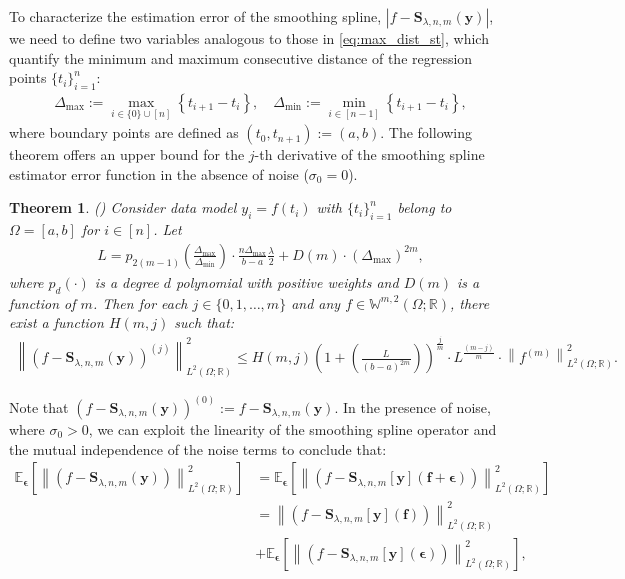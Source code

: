 \documentclass{article}
\newtheorem{theorem}{Theorem}
\newcommand{\norm}[1]{\left\lVert#1\right\rVert}
\newcommand{\lp}[1]{{L}^{#1}\left(\Omega; \mathbb{R}\right)}
\newcommand{\sob}[2]{\mathbb{W}^{#1,#2}\left(\Omega; \mathbb{R}\right)}
\newcommand{\spline}{\mathbf{S}_{\lambda,n,m}}
\begin{document}
To characterize the estimation error of the smoothing spline, $|f - \spline(\mathbf{y})|$, we need to define two variables analogous to those in \eqref{eq:max_dist_st}, which quantify the minimum and maximum consecutive distance of the regression points $\{t_i\}^n_{i=1}$:
\begin{gather}\label{eq:max_dist}
\Delta_\textrm{max}:=\underset{i\in \{0\} \cup [n]}{\max} \left\{t_{i+1}-t_i\right\}, \quad \Delta_\textrm{min}:=\underset{i\in [n-1]}{\min} \left\{t_{i+1}-t_i\right\},
\end{gather}
where boundary points are defined as $(t_0, t_{n+1}):=(a,b)$. The following theorem offers an upper bound for the $j$-th derivative of the smoothing spline estimator error function in the absence of noise ($\sigma_0 = 0$).
\begin{theorem} \label{th:lit_spline_noiseless} (\citep[Theorem 4.10]{ragozin1983error})
Consider data model $y_i = f(t_i)$ with $\{t_i\}^n_{i=1}$ belong to $\Omega=[a, b]$ for $i \in [n]$. Let
\begin{align}
L=p_{2(m-1)}(\frac{\Delta_\textrm{max}}{\Delta_\textrm{min}})\cdot\frac{n \Delta_\textrm{max}}{b-a} \frac{\lambda}{2}+D(m)\cdot \left({\Delta_\textrm{max}}\right)^{2 m},
\end{align}
where $p_{d}(\cdot)$ is a degree $d$ polynomial with positive weights and $D(m)$ is a function of $m$. Then for each  $j\in \{0,1,\dots,m\}$ and any $f\in\sob{m}{2}$, there exist a function $H(m, j)$ such that:
\begin{align}\label{eq:noiseless_bound}
    \norm{\left(f - \spline(\mathbf{y})\right)^{(j)}}_{\lp{2}}^2 \leqslant H(m, j)\left(1+\left(\frac{L}{(b-a)^{2m}}\right)\right)^{\frac{j}{m}}\cdot L^{\frac{(m-j)}{m}}\cdot \norm{f^{(m)}}^2_{\lp{2}}.
\end{align}
\end{theorem}
Note that $\left(f - \spline(\mathbf{y})\right)^{(0)} := f - \spline(\mathbf{y})$. In the presence of noise, where $\sigma_0 > 0$, we can exploit the linearity of the smoothing spline operator and the mutual independence of the noise terms to conclude that:
\begin{align}\label{eq:smooth_spline_linear_eq}
   \mathbb{E}_{\bm{\epsilon}}\left[\norm{\left(f - \spline(\mathbf{y})\right)}_{\lp{2}}^2\right] &= \mathbb{E}_{\bm{\epsilon}}\left[\norm{\left(f - \spline[\mathbf{y}](\mathbf{f} + \bm{\epsilon})\right)}_{\lp{2}}^2\right] \nonumber \\ &=\norm{\left(f - \spline[\mathbf{y}](\mathbf{f})\right)}_{\lp{2}}^2 \nonumber \\ &+ \mathbb{E}_{\bm{\epsilon}}\left[\norm{\left(f - \spline[\mathbf{y}](\bm{\epsilon})\right)}_{\lp{2}}^2\right],
\end{align}
\end{document}
